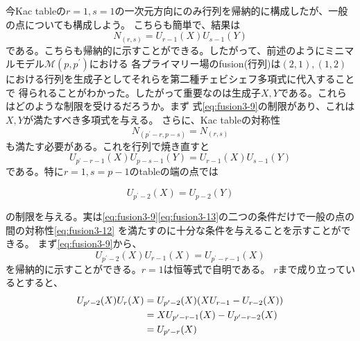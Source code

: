 \documentclass[11pt, aps, longbibliography]{article}
\numberwithin{equation}{section}
\begin{document}
        今Kac tableの$r=1, s=1$の一次元方向にのみ行列を帰納的に構成したが、一般の点についても構成しよう。
        こちらも簡単で、結果は
        \begin{equation}\label{eq:fusion3-10}
            N_{(r,s)} = U_{r-1}(X)U_{s-1}(Y)
        \end{equation}
        である。こちらも帰納的に示すことができる。したがって、前述のようにミニマルモデル$\mathcal{M}(p,p^\prime)$における
        各プライマリー場のfusion(行列)は$(2,1),(1,2)$における行列を生成子としてそれらを第二種チェビシェフ多項式に代入することで
        得られることがわかった。したがって重要なのは生成子$X,Y$である。これらはどのような制限を受けるだろうか。まず
        式\eqref{eq:fusion3-9}の制限があり、これは$X,Y$が満たすべき多項式を与える。
        さらに、Kac tableの対称性
        \begin{equation}\label{eq:fusion3-11}
            N_{(p^\prime-r, p-s)} = N_{(r,s)}
        \end{equation}
        も満たす必要がある。これを行列で焼き直すと
        \begin{equation}\label{eq:fusion3-12}
            U_{p^\prime-r-1}(X)U_{p-s-1}(Y) = U_{r-1}(X)U_{s-1}(Y)
        \end{equation}
        である。特に$r=1, s=p-1$のtableの端の点では
        \begin{tcolorbox}
            \begin{equation}\label{eq:fusion3-13}
                U_{p^\prime-2}(X) = U_{p-2}(Y)
            \end{equation}
        \end{tcolorbox}
        の制限を与える。実は\eqref{eq:fusion3-9}\eqref{eq:fusion3-13}の二つの条件だけで一般の点の間の対称性\eqref{eq:fusion3-12}
        を満たすのに十分な条件を与えることを示すことができる。
        まず\eqref{eq:fusion3-9}から、
        \begin{equation}\label{eq:fusion3-14}
            U_{p^\prime-2}(X)U_{r-1}(X) = U_{p^\prime-r-1}(X)
        \end{equation}
        を帰納的に示すことができる。$r=1$は恒等式で自明である。
        $r$まで成り立っているとすると、
        \begin{align}\label{eq:fusion3-15}
            U_{p^\prime-2}(X)U_{r}(X) &= U_{p^\prime-2}(X)(XU_{r-1}-U_{r-2}(X)) \notag \\
            &= XU_{p^\prime-r-1}(X) - U_{p^\prime-r-2}(X) \notag \\
            &= U_{p^\prime-r}(X)
        \end{align}
\end{document}
